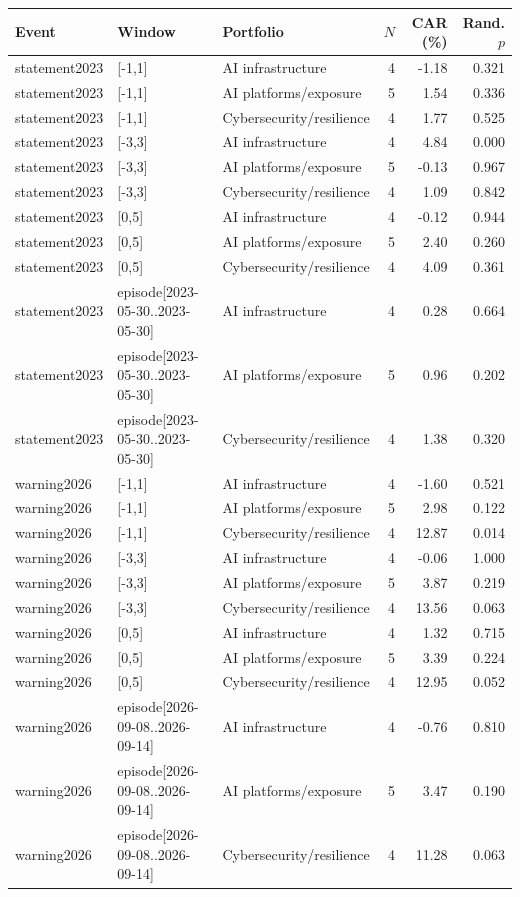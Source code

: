 \begin{tabular}{lllrrr}
\toprule
Event & Window & Portfolio & $N$ & CAR (\%) & Rand. $p$ \\
\midrule
statement2023 & [-1,1] & AI infrastructure & 4 & -1.18 & 0.321 \\
statement2023 & [-1,1] & AI platforms/exposure & 5 & 1.54 & 0.336 \\
statement2023 & [-1,1] & Cybersecurity/resilience & 4 & 1.77 & 0.525 \\
statement2023 & [-3,3] & AI infrastructure & 4 & 4.84 & 0.000 \\
statement2023 & [-3,3] & AI platforms/exposure & 5 & -0.13 & 0.967 \\
statement2023 & [-3,3] & Cybersecurity/resilience & 4 & 1.09 & 0.842 \\
statement2023 & [0,5] & AI infrastructure & 4 & -0.12 & 0.944 \\
statement2023 & [0,5] & AI platforms/exposure & 5 & 2.40 & 0.260 \\
statement2023 & [0,5] & Cybersecurity/resilience & 4 & 4.09 & 0.361 \\
statement2023 & episode[2023-05-30..2023-05-30] & AI infrastructure & 4 & 0.28 & 0.664 \\
statement2023 & episode[2023-05-30..2023-05-30] & AI platforms/exposure & 5 & 0.96 & 0.202 \\
statement2023 & episode[2023-05-30..2023-05-30] & Cybersecurity/resilience & 4 & 1.38 & 0.320 \\
warning2026 & [-1,1] & AI infrastructure & 4 & -1.60 & 0.521 \\
warning2026 & [-1,1] & AI platforms/exposure & 5 & 2.98 & 0.122 \\
warning2026 & [-1,1] & Cybersecurity/resilience & 4 & 12.87 & 0.014 \\
warning2026 & [-3,3] & AI infrastructure & 4 & -0.06 & 1.000 \\
warning2026 & [-3,3] & AI platforms/exposure & 5 & 3.87 & 0.219 \\
warning2026 & [-3,3] & Cybersecurity/resilience & 4 & 13.56 & 0.063 \\
warning2026 & [0,5] & AI infrastructure & 4 & 1.32 & 0.715 \\
warning2026 & [0,5] & AI platforms/exposure & 5 & 3.39 & 0.224 \\
warning2026 & [0,5] & Cybersecurity/resilience & 4 & 12.95 & 0.052 \\
warning2026 & episode[2026-09-08..2026-09-14] & AI infrastructure & 4 & -0.76 & 0.810 \\
warning2026 & episode[2026-09-08..2026-09-14] & AI platforms/exposure & 5 & 3.47 & 0.190 \\
warning2026 & episode[2026-09-08..2026-09-14] & Cybersecurity/resilience & 4 & 11.28 & 0.063 \\
\bottomrule
\end{tabular}
